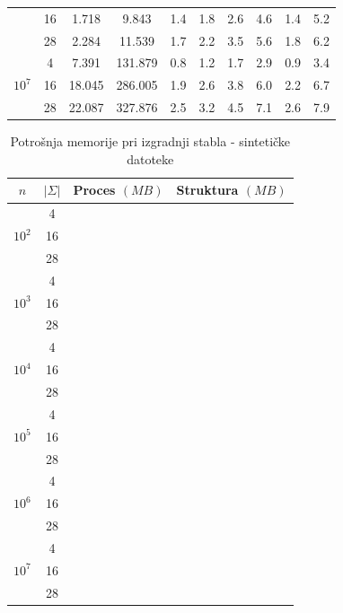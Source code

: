 \documentclass[times, utf8, seminar, numeric]{fer}
\begin{document}
\begin{table}[h]
\begin{tabular}{c|c|c|c|c|c|c|c|c|c}
      & \num{16} & \num{1.718} & \num{9.843} & \num{1.4} & \num{1.8} & \num{2.6} & \num{4.6} & \num{1.4} & \num{5.2} \\
      & \num{28} & \num{2.284} & \num{11.539} & \num{1.7} & \num{2.2} & \num{3.5} & \num{5.6} & \num{1.8} & \num{6.2} \\
    \hline
    \multirow{3}{*}{$10^7$}
      & \num{4} & \num{7.391} & \num{131.879} & \num{0.8} & \num{1.2} & \num{1.7} & \num{2.9} & \num{0.9} & \num{3.4} \\
      & \num{16} & \num{18.045} & \num{286.005} & \num{1.9} & \num{2.6} & \num{3.8} & \num{6.0} & \num{2.2} & \num{6.7} \\
      & \num{28} & \num{22.087} & \num{327.876} & \num{2.5} & \num{3.2} & \num{4.5} & \num{7.1} & \num{2.6} & \num{7.9} \\
  \end{tabular}
\end{table}

\begin{table}[h]
\caption{Potrošnja memorije pri izgradnji stabla - sintetičke datoteke}
\centering
  \begin{tabular}{c|c|c|c|c|c}
    $n$ & $|\Sigma|$ &
    \multicolumn{2}{c|}{Proces $(MB)$} & \multicolumn{2}{c}{Struktura $(MB)$} \\ \hline
    \multirow{3}{*}{$10^2$}
      & \num{4} \\
      & \num{16} \\
      & \num{28} \\
    \hline
    \multirow{3}{*}{$10^3$}
      & \num{4} \\
      & \num{16} \\
      & \num{28} \\
    \hline
    \multirow{3}{*}{$10^4$}
      & \num{4} \\
      & \num{16} \\
      & \num{28} \\
    \hline
    \multirow{3}{*}{$10^5$}
      & \num{4} \\
      & \num{16} \\
      & \num{28} \\
    \hline
    \multirow{3}{*}{$10^6$}
      & \num{4} \\
      & \num{16} \\
      & \num{28} \\
    \hline
    \multirow{3}{*}{$10^7$}
      & \num{4} \\
      & \num{16} \\
      & \num{28} \\
  \end{tabular}
\end{table}
\end{document}
